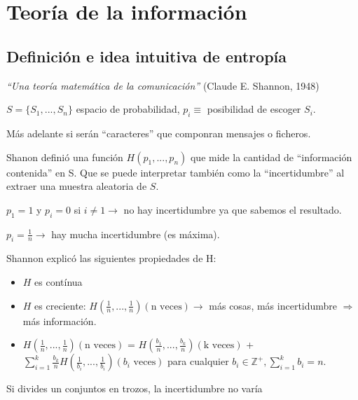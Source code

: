 \chapter{Teoría de la información}


\section{Definición e idea intuitiva de entropía}

	\textit{``Una teoría matemática de la comunicación''} (Claude E. Shannon, 1948)

	\begin{defn}
		$S = \{ S_1, ... , S_n \}$  espacio de probabilidad, $p_i \equiv$ posibilidad de escoger $S_i$.

	\end{defn}

	Más adelante si serán ``caracteres'' que componran mensajes o ficheros.

	\begin{defn}
		Shanon definió una función $ H(p_1, ..., p_n)$ que mide la cantidad de ``información contenida'' en S. Que se puede interpretar también como la ``incertidumbre'' al extraer una muestra aleatoria de $S$.
	\end{defn}

	\begin{example}
		$p_1 = 1$ y $p_i = 0$ si $i \neq 1 \rightarrow $ no hay incertidumbre ya que sabemos el resultado.

		$p_i = \frac{1}{n} \rightarrow $ hay mucha incertidumbre (es máxima).
	\end{example}


	Shannon explicó las siguientes propiedades de H:
	\begin{itemize}
		\item $H$ es contínua
		\item $H$ es creciente: $H(\frac{1}{n},...,\frac{1}{n}) (\text{n veces}) \rightarrow$ más cosas, más incertidumbre $\Rightarrow$ más información.
		\item $H(\frac{1}{n},...,\frac{1}{n}) (\text{n veces})$ =  $H(\frac{b_1}{n},...,\frac{b_k}{n}) (\text{k veces})$ + $\sum^{k}_{i = 1} \frac{b_k}{n} H(\frac{1}{b_i},...,\frac{1}{b_i}) (b_i \text{ veces})$ para cualquier $b_i \in \mathbb{Z}^+, \sum^{k}_{i = 1} b_i = n$.
	\end{itemize}

	\begin{prop}
		Si divides un conjuntos en trozos, la incertidumbre no varía
	\end{prop}

